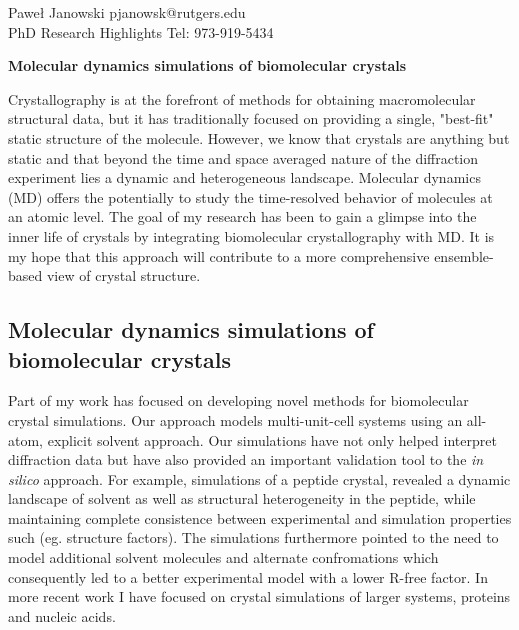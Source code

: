 \documentclass[10.5pt]{article}
\author{Pawe\l{} Janowski}
\begin{document}
    \begin{flushleft}
    \parskip 0pt
\begin{large}
        Pawe\l{} Janowski \hfill pjanowsk@rutgers.edu\\
    PhD Research Highlights \hfill Tel: 973-919-5434\\
\end{large}
    \end{flushleft}
    
    
    
    \begin{center}
\begin{large}
        \textbf{Molecular dynamics simulations of biomolecular crystals}
\end{large}
    \end{center}

Crystallography is at the forefront of methods for obtaining macromolecular structural data, but it has traditionally focused on providing a single, "best-fit" static structure of the molecule. However, we know that crystals are anything but static and that beyond the time and space averaged nature of the diffraction experiment lies a dynamic and heterogeneous landscape. Molecular dynamics (MD) offers the potentially to study the time-resolved behavior of molecules at an atomic level. The goal of my research has been to gain a glimpse into the inner life of crystals by integrating biomolecular crystallography with MD. It is my hope that this approach will contribute to a more comprehensive ensemble-based view of crystal structure. 

\subsection*{Molecular dynamics simulations of biomolecular crystals}
Part of my work has focused on developing novel methods for biomolecular crystal simulations. Our approach models multi-unit-cell systems using an all-atom, explicit solvent approach. Our simulations have not only helped interpret diffraction data but have also provided an important validation tool to the \textit{in silico} approach. For example, simulations of a peptide crystal, revealed a dynamic landscape of solvent as well as structural heterogeneity in the peptide, while maintaining complete consistence between experimental and simulation properties such (eg. structure factors). The simulations furthermore pointed to the need to model additional solvent molecules and alternate confromations which consequently led to a better experimental model with a lower R-free factor. In more recent work I have focused on crystal simulations of larger systems, proteins and nucleic acids.
\end{document}
